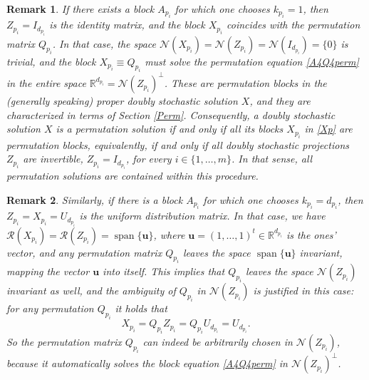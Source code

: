 \documentclass{article}
\newtheorem{remark}{Remark}[section]
\theoremstyle{definition}\newtheorem{example}{Example}[section]
\def\N{{\mathcal{N}}}
\def\R{{\mathcal{R}}}
\def\RR{\mathbb{R}}
\begin{document}
\begin{remark}\label{rem1} If there exists a block $A_{p_i}$ for which one chooses $k_{p_i}=1$, then $Z_{p_i}=I_{d_{p_i}}$ is the identity matrix, and the block $X_{p_i}$ coincides with the permutation matrix $Q_{p_i}$. In that case, the space $\N(X_{p_i})=\N(Z_{p_i})=\N(I_{d_{p_i}})=\{0\}$ is trivial, and the block $X_{p_i}\equiv Q_{p_i}$ must solve the permutation equation \eqref{A4Q4perm} in the entire space $\RR^{d_{p_i}}=\N(Z_{p_i})^\perp$. These are \emph{permutation blocks} in the (generally speaking) proper doubly stochastic solution $X$, and they are characterized in terms of Section \ref{Perm}. Consequently, a doubly stochastic solution $X$ is a permutation solution if and only if all its blocks $X_{p_i}$ in \eqref{Xp} are permutation blocks, equivalently, if and only if all doubly stochastic projections $Z_{p_i}$ are invertible, $Z_{p_i}=I_{d_{p_i}}$, for every $i\in\{1,\ldots,m\}$. In that sense, all permutation solutions are contained within this procedure.
\end{remark}

\begin{remark} \label{rem2} Similarly, if  there is  a block $A_{p_i}$ for which one chooses $k_{p_i}=d_{p_i}$, then $Z_{p_i}=X_{p_i}=U_{d_{p_i}}$ is the uniform distribution matrix. In that case, we have $\R(X_{p_i})=\R(Z_{p_i})=\operatorname{span}\{\mathbf{u}\}$, where $\mathbf{u}=(1,\ldots,1)^t\in \RR^{d_{p_i}}$ is the ones' vector, and any permutation matrix $Q_{p_i}$ leaves the space $\operatorname{span}\{\mathbf{u}\}$ invariant,
	mapping the vector $\mathbf{u}$ into itself. This implies that $Q_{p_i}$ leaves the space $\N(Z_{p_i})$ invariant as well, and the ambiguity of $Q_{p_i}$ in $\N(Z_{p_i})$ is justified in this case: for any permutation $Q_{p_i}$ it holds that
	$$X_{p_i}=Q_{p_i}Z_{p_i}=Q_{p_i}U_{d_{p_i}}=U_{d_{p_i}}.$$ 
	So the permutation matrix $Q_{p_i}$ can indeed be arbitrarily chosen in $\N(Z_{p_i})$, because it automatically solves the block equation \eqref{A4Q4perm} in $\N(Z_{p_i})^\perp$.
\end{remark}
\end{document}
